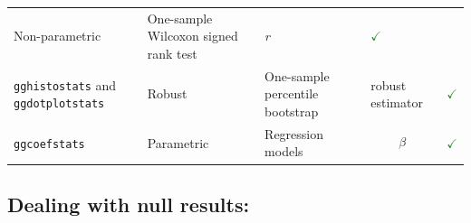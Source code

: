 \documentclass[]{article}
\begin{document}
\begin{longtable}[]{@{}lllll@{}}
\begin{minipage}[t]{0.16\columnwidth}
Non-parametric\strut
\end{minipage} & \begin{minipage}[t]{0.31\columnwidth}\raggedright
One-sample Wilcoxon signed rank test\strut
\end{minipage} & \begin{minipage}[t]{0.12\columnwidth}\raggedright
\emph{r}\strut
\end{minipage} & \begin{minipage}[t]{0.07\columnwidth}\raggedright
\textcolor{ForestGreen}{$\checkmark$}\strut
\end{minipage}\tabularnewline
\begin{minipage}[t]{0.20\columnwidth}\raggedright
\texttt{gghistostats} and \texttt{ggdotplotstats}\strut
\end{minipage} & \begin{minipage}[t]{0.16\columnwidth}\raggedright
Robust\strut
\end{minipage} & \begin{minipage}[t]{0.31\columnwidth}\raggedright
One-sample percentile bootstrap\strut
\end{minipage} & \begin{minipage}[t]{0.12\columnwidth}\raggedright
robust estimator\strut
\end{minipage} & \begin{minipage}[t]{0.07\columnwidth}\raggedright
\textcolor{ForestGreen}{$\checkmark$}\strut
\end{minipage}\tabularnewline
\begin{minipage}[t]{0.20\columnwidth}\raggedright
\texttt{ggcoefstats}\strut
\end{minipage} & \begin{minipage}[t]{0.16\columnwidth}\raggedright
Parametric\strut
\end{minipage} & \begin{minipage}[t]{0.31\columnwidth}\raggedright
Regression models\strut
\end{minipage} & \begin{minipage}[t]{0.12\columnwidth}\raggedright
\[\beta\]\strut
\end{minipage} & \begin{minipage}[t]{0.07\columnwidth}\raggedright
\textcolor{ForestGreen}{$\checkmark$}\strut
\end{minipage}\tabularnewline
\bottomrule
\end{longtable}

\hypertarget{dealing-with-null-results}{%
\subsection{\texorpdfstring{Dealing with \textbf{null results}:}{Dealing with null results:}}\label{dealing-with-null-results}}
\end{document}
